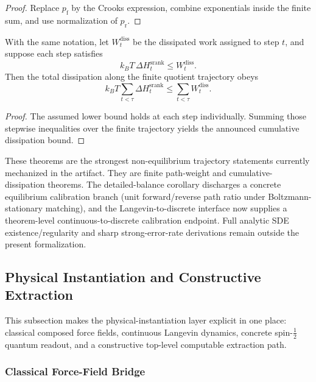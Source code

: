 \begin{proof}
Replace $p_{\mathrm f}$ by the Crooks expression, combine exponentials inside the finite sum, and use normalization of $p_{\mathrm r}$.
\end{proof}

\begin{theorem}\label{thm:quotient-trajectory-dissipation}
With the same notation, let $W^{\mathrm{diss}}_t$ be the dissipated work assigned to step $t$, and suppose each step satisfies
\[
k_B T\,\Delta H^{\mathrm{srank}}_t \le W^{\mathrm{diss}}_t.
\]
Then the total dissipation along the finite quotient trajectory obeys
\[
k_B T\sum_{t<\tau} \Delta H^{\mathrm{srank}}_t
\le
\sum_{t<\tau} W^{\mathrm{diss}}_t.
\]
\end{theorem}

\begin{proof}
The assumed lower bound holds at each step individually. Summing those stepwise inequalities over the finite trajectory yields the announced cumulative dissipation bound.
\end{proof}

These theorems are the strongest non-equilibrium trajectory statements currently mechanized in the artifact. They are finite path-weight and cumulative-dissipation theorems. The detailed-balance corollary discharges a concrete equilibrium calibration branch (unit forward/reverse path ratio under Boltzmann-stationary matching), and the Langevin-to-discrete interface now supplies a theorem-level continuous-to-discrete calibration endpoint. Full analytic SDE existence/regularity and sharp strong-error-rate derivations remain outside the present formalization.

\subsection{Physical Instantiation and Constructive Extraction}

This subsection makes the physical-instantiation layer explicit in one place: classical composed force fields, continuous Langevin dynamics, concrete spin-$\tfrac12$ quantum readout, and a constructive top-level computable extraction path.

\subsubsection{Classical Force-Field Bridge}

